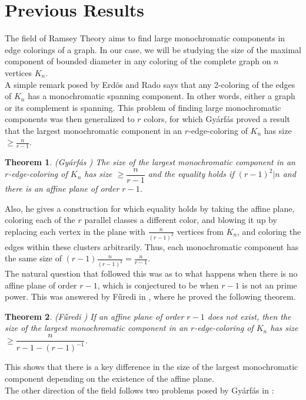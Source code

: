 \documentclass{article}
\newtheorem{theorem}{Theorem}
\begin{document}
	\section{Previous Results}
	The field of Ramsey Theory aims to find large monochromatic components in edge colorings of a graph. In our case, we will be studying the size of the maximal component of bounded diameter in any coloring of the complete graph on $ n $ vertices $ K_n $.\\
	A simple remark posed by Erd\"{o}s and Rado says that any 2-coloring of the edges of $ K_n $ has a monochromatic spanning component. In other words, either a graph or its complement is spanning. This problem of finding large monochromatic components was then generalized to $ r $ colors, for which Gy\'{a}rf\'{a}s proved a result that the largest monochromatic component in an $ r $-edge-coloring of $ K_n $ has size $ \geq \frac{n}{r-1} $. 
	\begin{theorem}\label{1}(Gy\'{a}rf\'{a}s \cite{Gy1})
		The size of the largest monochromatic component in an $ r $-edge-coloring of $ K_n $ has size $ \geq \dfrac{n}{r-1} $ and the equality holds if $ (r-1)^2|n $ and there is an affine plane of order $ r-1 $.
	\end{theorem}
	Also, he gives a construction for which equality holds by taking the affine plane, coloring each of the $ r $ parallel classes a different color, and blowing it up by replacing each vertex in the plane with $ \frac{n}{(r-1)^2} $ vertices from $ K_n $, and coloring the edges within these clusters arbitrarily. Thus, each monochromatic component has the same size of $ (r-1)\frac{n}{(r-1)^2}=\frac{n}{r-1} $.\\
	The natural question that followed this was as to what happens when there is no affine plane of order $ r-1 $, which is conjectured to be when $ r-1 $ is not an prime power. This was answered by F\H{u}redi in \cite{F}, where he proved the following theorem.
	\begin{theorem}\label{2}(F\H{u}redi \cite{F})
		If an affine plane of order $ r-1 $ does not exist, then the size of the largest monochromatic component in an $ r $-edge-coloring of $ K_n $ has size $ \geq \dfrac{n}{r-1-(r-1)^{-1}} $.
	\end{theorem}
	This shows that there is a key difference in the size of the largest monochromatic component depending on the existence of the affine plane.\\
	The other direction of the field follows two problems posed by Gy\'{a}rf\'{a}s in \cite{Gy2}:
\end{document}
